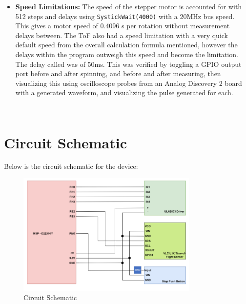 \documentclass[12pt, letterpaper]{article}
\begin{document}
\begin{itemize}
\item \textbf{Speed Limitations: } The speed of the stepper motor is accounted for with 512 steps and delays using \verb|SystickWait(4000)| with a 20MHz bus speed. This gives a motor speed of 0.4096 s per rotation without measurement delays between. 
The ToF also had a speed limitation with a very quick default speed from the overall calculation formula mentioned, however the delays within the program outweigh this speed and become the limitation. The delay called was of 50ms. This was verified by toggling a GPIO output port before and after spinning, and before and after measuring, then visualizing this using oscilloscope probes from an Analog Discovery 2 board with a generated waveform, and visualizing the pulse generated for each. 
\end{itemize} 
\\
\section{Circuit Schematic}\label{sec:Circuit Schematic}

Below is the circuit schematic for the device:

\begin{figure}[htbp]
\centering
\includegraphics[width=0.8\textwidth]{schematic.png}
\caption{Circuit Schematic}
\end{figure}
\newpage
\end{document}
